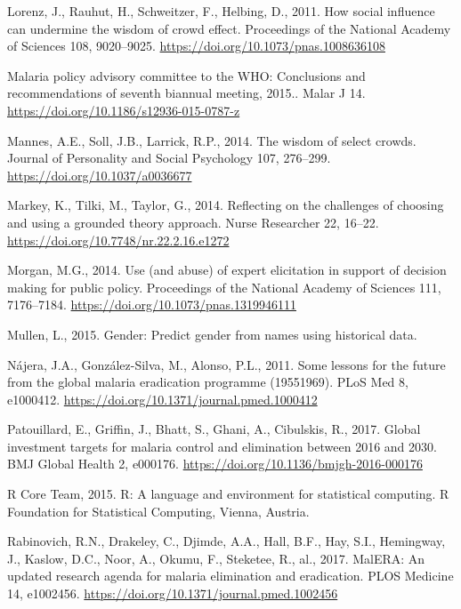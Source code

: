 \documentclass[]{article}
\begin{document}
\hypertarget{ref-Lorenz_2011}{}
Lorenz, J., Rauhut, H., Schweitzer, F., Helbing, D., 2011. How social
influence can undermine the wisdom of crowd effect. Proceedings of the
National Academy of Sciences 108, 9020--9025.
\url{https://doi.org/10.1073/pnas.1008636108}

\hypertarget{ref-WHO2015}{}
Malaria policy advisory committee to the WHO: Conclusions and
recommendations of seventh biannual meeting, 2015.. Malar J 14.
\url{https://doi.org/10.1186/s12936-015-0787-z}

\hypertarget{ref-Mannes_2014}{}
Mannes, A.E., Soll, J.B., Larrick, R.P., 2014. The wisdom of select
crowds. Journal of Personality and Social Psychology 107, 276--299.
\url{https://doi.org/10.1037/a0036677}

\hypertarget{ref-Markey_2014}{}
Markey, K., Tilki, M., Taylor, G., 2014. Reflecting on the challenges of
choosing and using a grounded theory approach. Nurse Researcher 22,
16--22. \url{https://doi.org/10.7748/nr.22.2.16.e1272}

\hypertarget{ref-Morgan_2014}{}
Morgan, M.G., 2014. Use (and abuse) of expert elicitation in support of
decision making for public policy. Proceedings of the National Academy
of Sciences 111, 7176--7184.
\url{https://doi.org/10.1073/pnas.1319946111}

\hypertarget{ref-Lincoln}{}
Mullen, L., 2015. Gender: Predict gender from names using historical
data.

\hypertarget{ref-Njera2011}{}
Nájera, J.A., González-Silva, M., Alonso, P.L., 2011. Some lessons for
the future from the global malaria eradication programme (19551969).
PLoS Med 8, e1000412. \url{https://doi.org/10.1371/journal.pmed.1000412}

\hypertarget{ref-Patouillard2017}{}
Patouillard, E., Griffin, J., Bhatt, S., Ghani, A., Cibulskis, R., 2017.
Global investment targets for malaria control and elimination between
2016 and 2030. BMJ Global Health 2, e000176.
\url{https://doi.org/10.1136/bmjgh-2016-000176}

\hypertarget{ref-R}{}
R Core Team, 2015. R: A language and environment for statistical
computing. R Foundation for Statistical Computing, Vienna, Austria.

\hypertarget{ref-Rabinovich_2017}{}
Rabinovich, R.N., Drakeley, C., Djimde, A.A., Hall, B.F., Hay, S.I.,
Hemingway, J., Kaslow, D.C., Noor, A., Okumu, F., Steketee, R., al.,
2017. MalERA: An updated research agenda for malaria elimination and
eradication. PLOS Medicine 14, e1002456.
\url{https://doi.org/10.1371/journal.pmed.1002456}
\end{document}

